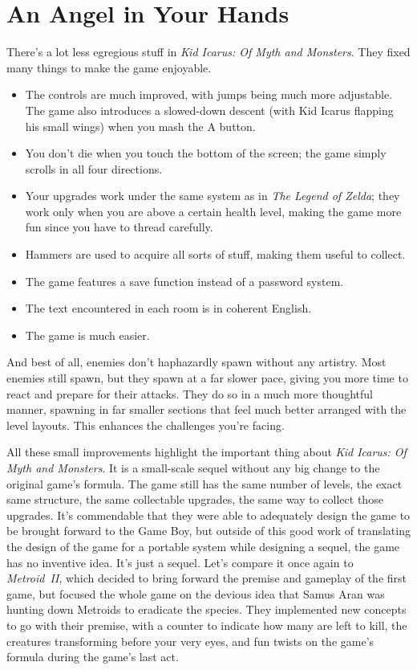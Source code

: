 \documentclass{book}
\begin{document}
\FloatBarrier\needspace{10mm}\section*{An Angel in Your Hands}\nopagebreak[4]

There’s a lot less egregious stuff in \emph{Kid Icarus: Of Myth and Monsters}. They fixed many things to make the game enjoyable.

\begin{itemize} \setlength\itemsep{-0.4em}
\item The controls are much improved, with jumps being much more adjustable. The game also introduces a slowed-down descent (with Kid Icarus flapping his small wings) when you mash the A button.
\item You don’t die when you touch the bottom of the screen; the game simply scrolls in all four directions.
\item Your upgrades work under the same system as in \emph{The Legend of Zelda}; they work only when you are above a certain health level, making the game more fun since you have to thread carefully.
\item Hammers are used to acquire all sorts of stuff, making them useful to collect.
\item The game features a save function instead of a password system.
\item The text encountered in each room is in coherent English.
\item The game is much easier.
\end{itemize}\noindent

And best of all, enemies don’t haphazardly spawn without any artistry. Most enemies still spawn, but they spawn at a far slower pace, giving you more time to react and prepare for their attacks. They do so in a much more thoughtful manner, spawning in far smaller sections that feel much better arranged with the level layouts. This enhances the challenges you’re facing.

All these small improvements highlight the important thing about \emph{Kid Icarus: Of Myth and Monsters}. It is a small-scale sequel without any big change to the original game’s formula. The game still has the same number of levels, the exact same structure, the same collectable upgrades, the same way to collect those upgrades. It’s commendable that they were able to adequately design the game to be brought forward to the Game Boy, but outside of this good work of translating the design of the game for a portable system while designing a sequel, the game has no inventive idea. It’s just a sequel. Let’s compare it once again to \emph{Metroid II}, which decided to bring forward the premise and gameplay of the first game, but focused the whole game on the devious idea that Samus Aran was hunting down Metroids to eradicate the species. They implemented new concepts to go with their premise, with a counter to indicate how many are left to kill, the creatures transforming before your very eyes, and fun twists on the game’s formula during the game’s last act.
\end{document}
